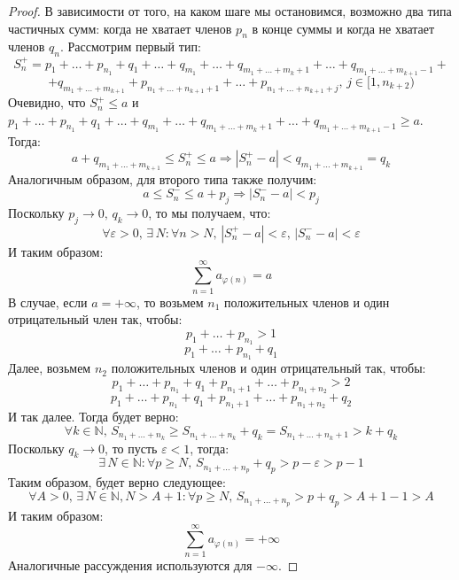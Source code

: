 \documentclass[12pt]{article}
\newcommand{\MN}{\mathbb{N}}
\newcommand{\VE}{\varepsilon}
\theoremstyle{definition}
\begin{document}
\begin{proof}
	В зависимости от того, на каком шаге мы остановимся, возможно два типа частичных сумм: когда не хватает членов $p_n$ в конце суммы и когда не хватает членов $q_n$. Рассмотрим первый тип:
	$$
		S_n^{+} = p_1 + \dotsc + p_{n_1} + q_1 + \dotsc + q_{m_1} + \dotsc + q_{m_1 + \dotsc + m_{k} + 1} + \dotsc + q_{m_1 + \dotsc + m_{k + 1} - 1} + 
	$$
	$$
		+ q_{m_1 + \dotsc + m_{k + 1} } + p_{n_1 + \dotsc + n_{k+1} + 1} + \dotsc + p_{n_1 + \dotsc + n_{k+1} + j}, \, j \in [1,n_{k+2})
	$$
	Очевидно, что $S_n^{+} \leq a$ и  $ p_1 + \dotsc + p_{n_1} + q_1 + \dotsc + q_{m_1} + \dotsc + q_{m_1 + \dotsc + m_{k} + 1} + \dotsc + q_{m_1 + \dotsc + m_{k + 1} - 1} \geq a$. Тогда:
	$$
		a + q_{m_1 + \dotsc + m_{k + 1} } \leq S_n^{+} \leq a \Rightarrow \left|S_n^{+} -a\right| < q_{m_1 + \dotsc + m_{k + 1} } = q_k
	$$
	Аналогичным образом, для второго типа также получим:
	$$
		a \leq S_n^{-} \leq a + p_j \Rightarrow \left|S_n^{-} - a\right| < p_j
	$$
	Поскольку $p_j \to 0, \, q_k \to 0$, то мы получаем, что:
	$$
		\forall \VE > 0, \, \exists \, N \colon \forall n > N, \, \left|S_n^{+} - a\right| < \VE, \, \left|S_n^{-} - a\right| < \VE
	$$
	И таким образом: 
	$$
		\displaystyle \sum\limits_{n = 1 }^{\infty} a_{\varphi(n)} = a
	$$
	В случае, если $a = +\infty$, то возьмем $n_1$ положительных членов и один отрицательный член так, чтобы:
	$$
		p_1 + \dotsc + p_{n_1} > 1
	$$
	$$
		p_1 + \dotsc + p_{n_1} + q_1
	$$
	Далее, возьмем $n_2$ положительных членов и один отрицательный так, чтобы:
	$$
		p_1 + \dotsc + p_{n_1} + q_1 + p_{n_1 + 1} + \dotsc + p_{n_1 + n_2} > 2
	$$
	$$
		p_1 + \dotsc + p_{n_1} + q_1 + p_{n_1 + 1} + \dotsc + p_{n_1 + n_2}  + q_2
	$$
	И так далее. Тогда будет верно:
	$$
		\forall k \in \MN, \, S_{n_1 + \dotsc + n_k } \geq S_{n_1 + \dotsc + n_k} + q_k = S_{n_1 + \dotsc + n_k + 1} > k + q_k
	$$
	Поскольку $q_k \to 0$, то пусть $\VE < 1$, тогда:
	$$
		\exists \, N \in \MN \colon \forall p \geq N, \, S_{n_1 + \dotsc + n_p} + q_p > p - \VE > p - 1
	$$
	Таким образом, будет верно следующее:
	$$
		\forall A > 0, \, \exists \, N  \in \MN, N > A + 1 \colon \forall p \geq N, \, S_{n_1 + \dotsc + n_p} > p + q_p >  A + 1 - 1 > A
	$$
	И таким образом:
	$$
		\displaystyle \sum\limits_{n = 1 }^{\infty} a_{\varphi(n)} = +\infty
	$$
	Аналогичные рассуждения используются для $- \infty$.
\end{proof}
\newpage
\end{document}
